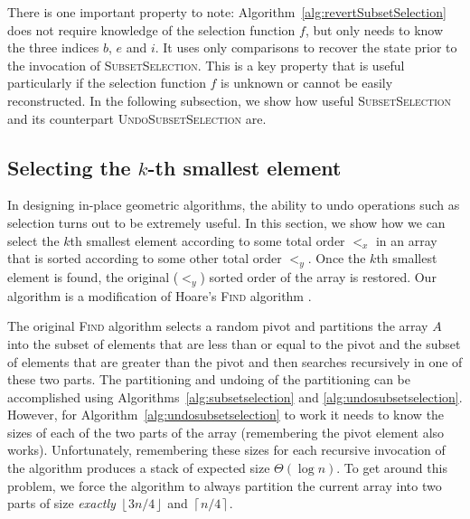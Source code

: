 \documentclass{elsart}
\newcommand{\floor}[1]{\left\lfloor #1 \right\rfloor}
\newcommand{\ceil}[1]{\left\lceil #1 \right\rceil}
\begin{document}
There is one important property to note:
Algorithm~\ref{alg:revertSubsetSelection} does not require knowledge
of the selection function $f$, but only needs to know the three
indices $b$, $e$ and $i$. It uses only comparisons to recover the
state prior to the invocation of \textsc{SubsetSelection}. This is a
key property that is useful particularly if the selection function $f$
is unknown or cannot be easily reconstructed.  In the following
subsection, we show how useful \textsc{SubsetSelection} and its
counterpart \textsc{UndoSubsetSelection} are.


\subsection{Selecting the $k$-th smallest element}\label{sec:sel}

In designing in-place geometric algorithms, the ability to undo
operations such as selection turns out to be extremely useful.  In
this section, we show how we can select the $k$th smallest element
according to some total order $<_x$ in an array that is sorted
according to some other total order $<_y$.  Once the $k$th smallest
element is found, the original ($<_y$) sorted order of the array is
restored.  Our algorithm is a modification of Hoare's \textsc{Find}
algorithm \cite{hoare:find}.

The original \textsc{Find} algorithm selects a random pivot and
partitions the array $A$ into the subset of elements that are less
than or equal to the pivot and the subset of elements that are greater
than the pivot and then searches recursively in one of these two
parts.  The partitioning and undoing of the partitioning can be
accomplished using Algorithms~\ref{alg:subsetselection} and
\ref{alg:undosubsetselection}.  However, for
Algorithm~\ref{alg:undosubsetselection} to work it needs to know the
sizes of each of the two parts of the array (remembering the pivot
element also works).  Unfortunately, remembering these sizes for each
recursive invocation of the algorithm produces a stack of expected
size $\Theta(\log n)$.  To get around this problem, we force the
algorithm to always partition the current array into two parts of size
\emph{exactly} $\floor{3n/4}$ and $\ceil{n/4}$.
\end{document}
